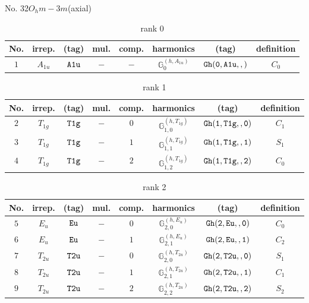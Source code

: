 \documentclass[fleqn,8pt]{jsarticle}
\begin{document}
\setcounter{MaxMatrixCols}{16}

\begin{center}
\LARGE
No. 32\quad$O_{h}$\quad$m-3m$\quad[ cubic ] (axial)
\end{center}
\begin{table}[ht!]
\begin{center}
\caption{rank 0}
\renewcommand{\arraystretch}{1.3}
\begin{tabular}{cccccccc} \hline \hline
No. & irrep. & (tag) & mul. & comp. & harmonics & (tag) & definition \\ \hline
$ 1 $ & $ A_{1u} $ & $ {\tt A1u} $ & $ - $ & $ - $ & $ \mathbb{G}_{0}^{(h,A_{1u})} $ & $ {\tt Gh(0,A1u,,)} $ & $ C_{0} $ \\
 \hline \hline
\end{tabular}
\end{center}
\end{table}
\begin{table}[ht!]
\begin{center}
\caption{rank 1}
\renewcommand{\arraystretch}{1.3}
\begin{tabular}{cccccccc} \hline \hline
No. & irrep. & (tag) & mul. & comp. & harmonics & (tag) & definition \\ \hline
$ 2 $ & $ T_{1g} $ & $ {\tt T1g} $ & $ - $ & $ 0 $ & $ \mathbb{G}_{1,0}^{(h,T_{1g})} $ & $ {\tt Gh(1,T1g,,0)} $ & $ C_{1} $ \\
$ 3 $ & $ T_{1g} $ & $ {\tt T1g} $ & $ - $ & $ 1 $ & $ \mathbb{G}_{1,1}^{(h,T_{1g})} $ & $ {\tt Gh(1,T1g,,1)} $ & $ S_{1} $ \\
$ 4 $ & $ T_{1g} $ & $ {\tt T1g} $ & $ - $ & $ 2 $ & $ \mathbb{G}_{1,2}^{(h,T_{1g})} $ & $ {\tt Gh(1,T1g,,2)} $ & $ C_{0} $ \\
 \hline \hline
\end{tabular}
\end{center}
\end{table}
\begin{table}[ht!]
\begin{center}
\caption{rank 2}
\renewcommand{\arraystretch}{1.3}
\begin{tabular}{cccccccc} \hline \hline
No. & irrep. & (tag) & mul. & comp. & harmonics & (tag) & definition \\ \hline
$ 5 $ & $ E_{u} $ & $ {\tt Eu} $ & $ - $ & $ 0 $ & $ \mathbb{G}_{2,0}^{(h,E_{u})} $ & $ {\tt Gh(2,Eu,,0)} $ & $ C_{0} $ \\
$ 6 $ & $ E_{u} $ & $ {\tt Eu} $ & $ - $ & $ 1 $ & $ \mathbb{G}_{2,1}^{(h,E_{u})} $ & $ {\tt Gh(2,Eu,,1)} $ & $ C_{2} $ \\
$ 7 $ & $ T_{2u} $ & $ {\tt T2u} $ & $ - $ & $ 0 $ & $ \mathbb{G}_{2,0}^{(h,T_{2u})} $ & $ {\tt Gh(2,T2u,,0)} $ & $ S_{1} $ \\
$ 8 $ & $ T_{2u} $ & $ {\tt T2u} $ & $ - $ & $ 1 $ & $ \mathbb{G}_{2,1}^{(h,T_{2u})} $ & $ {\tt Gh(2,T2u,,1)} $ & $ C_{1} $ \\
$ 9 $ & $ T_{2u} $ & $ {\tt T2u} $ & $ - $ & $ 2 $ & $ \mathbb{G}_{2,2}^{(h,T_{2u})} $ & $ {\tt Gh(2,T2u,,2)} $ & $ S_{2} $ \\
 \hline \hline
\end{tabular}
\end{center}
\end{table}
\end{document}
